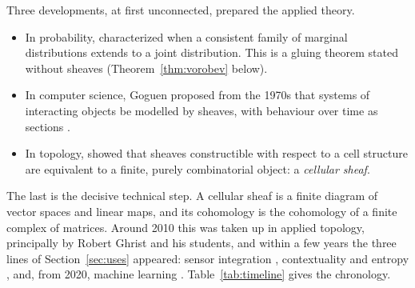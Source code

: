 \documentclass[11pt,a4paper,oneside]{scrartcl}
\theoremstyle{guideplain}
\theoremstyle{guidedef}
\begin{document}
Three developments, at first unconnected, prepared the applied theory.
\begin{itemize}
  \item In probability, \textcite{vorobev1962} characterized when a consistent family of marginal
        distributions extends to a joint distribution. This is a gluing theorem stated without
        sheaves (Theorem~\ref{thm:vorobev} below).
  \item In computer science, Goguen proposed from the 1970s that systems of interacting objects be
        modelled by sheaves, with behaviour over time as sections \autocite{goguen1992}.
  \item In topology, \textcite{shepard1985} showed that sheaves constructible with respect to a cell
        structure are equivalent to a finite, purely combinatorial object: a \emph{cellular sheaf}.
\end{itemize}
The last is the decisive technical step. A cellular sheaf is a finite diagram of vector spaces and
linear maps, and its cohomology is the cohomology of a finite complex of matrices. Around 2010 this
was taken up in applied topology, principally by Robert Ghrist and his students, and within a few
years the three lines of Section~\ref{sec:uses} appeared: sensor integration \autocite{robinson2017},
contextuality and entropy \autocite{abramsky2011,baudot2015}, and, from 2020, machine learning
\autocite{hansengebhart2020,bodnar2022}. Table~\ref{tab:timeline} gives the chronology.
\end{document}
